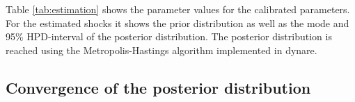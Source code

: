 \begin{table}
  \centering
  \caption{Parameterization}
  \label{tab:estimation}
\end{table}

Table \ref{tab:estimation} shows the parameter values for the calibrated
parameters. For the estimated shocks it shows the prior distribution as well as
the mode and 95\% HPD-interval of the posterior distribution. The posterior
distribution is reached using the Metropolis-Hastings algorithm implemented in dynare.

\subsection{Convergence of the posterior distribution}
\label{sec:convergence}
\blindtext




